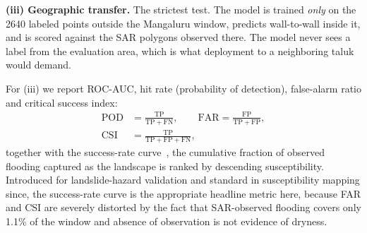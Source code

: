 \documentclass[10pt,twocolumn]{article}
\begin{document}
\textbf{(iii) Geographic transfer.} The strictest test. The model is trained
\emph{only} on the \num{2640} labeled points outside the Mangaluru window,
predicts wall-to-wall inside it, and is scored against the SAR polygons observed
there. The model never sees a label from the evaluation area, which is what
deployment to a neighboring taluk would demand.

For (iii) we report ROC-AUC, hit rate (probability of detection),
false-alarm ratio and critical success index:
\begin{equation}
\begin{aligned}
\mathrm{POD}&=\tfrac{\mathrm{TP}}{\mathrm{TP}+\mathrm{FN}}, \qquad
\mathrm{FAR}=\tfrac{\mathrm{FP}}{\mathrm{TP}+\mathrm{FP}}, \\[2pt]
\mathrm{CSI}&=\tfrac{\mathrm{TP}}{\mathrm{TP}+\mathrm{FP}+\mathrm{FN}},
\end{aligned}
\label{eq:contingency}
\end{equation}
together with the success-rate curve~\citep{chung2003}, the cumulative fraction
of observed flooding captured as the landscape is ranked by descending
susceptibility. Introduced for landslide-hazard validation and standard in
susceptibility mapping since, the success-rate curve is the appropriate headline
metric here, because FAR and CSI
are severely distorted by the fact that SAR-observed flooding covers only 1.1\%
of the window and absence of observation is not evidence of dryness.
\end{document}
